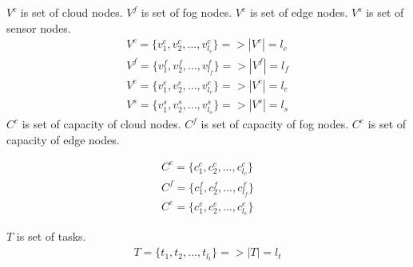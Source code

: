 \documentclass[conference]{IEEEtran}
\begin{document}
    $V^c$ is set of cloud nodes.
    $V^f$ is set of fog nodes.
    $V^e$ is set of edge nodes.
    $V^s$ is set of sensor nodes.
    \begin{subequations}
      \begin{align}
          V^c = \{v_1^c, v_2^c, ..., v_{l_c}^c\} => |V^c| = l_c\\
          V^f = \{v_1^f, v_2^f, ..., v_{l_f}^f\}=> |V^f| = l_f\\
          V^e = \{v_1^e, v_2^e, ..., v_{l_e}^e\}=> |V^e| = l_e\\
          V^s = \{v_1^s, v_2^s, ..., v_{l_s}^s\}=> |V^s| = l_s
      \end{align}
    \end{subequations}
    $C^c$ is set of capacity of cloud nodes.
    $C^f$ is set of capacity of fog nodes.
    $C^e$ is set of capacity of edge nodes.

    \begin{subequations}
      \begin{align}
          C^c = \{c_1^c, c_2^c, ..., c_{l_c}^c\}\\
          C^f = \{c_1^f, c_2^f, ..., c_{l_f}^f\}\\
          C^e = \{c_1^e, c_2^e, ..., c_{l_e}^e\}
      \end{align}
    \end{subequations}

    $T$ is set of tasks.
    \begin{subequations}
      \begin{align}
          T = \{t_1, t_2, ..., t_{l_t}\} => |T| = l_t\\
      \end{align}
    \end{subequations}
\end{document}
